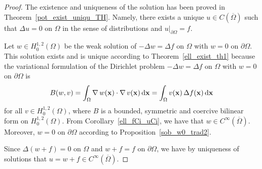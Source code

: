 \begin{proof}
The existence and uniqueness of the solution has been proved in
Theorem~\ref{pot_exist_uniqu_TH}.  Namely, there exists a unique
$u \in C(\overline{\Omega})$ such that $\Delta u = 0$ on $\Omega$ in
the sense of distributions and $u\big|_{\partial \Omega} = f$.

Let $\displaystyle w \in H^{1,2}_0(\Omega)$ be the weak solution of
$-\Delta w = \Delta f$ on $\Omega$ with $w=0$ on $\partial \Omega$.
This solution exists and is unique according to
Theorem~\ref{ell_exist_th1} because the variational formulation of the
Dirichlet problem $-\Delta w = \Delta f$ on $\Omega$ with $w=0$
on $\partial \Omega$ is
\[
B(w,v) = \int_\Omega \operatorname{\nabla} w(\mathbf{x}) \cdot \operatorname{\nabla} v(\mathbf{x})
\,\mathrm{d}{\mathbf{x}} = \int_\Omega v(\mathbf{x}) \, \Delta f(\mathbf{x})
\,\mathrm{d}{\mathbf{x}}
\]
for all $\displaystyle v \in H^{1,2}_0(\Omega)$,
where $B$ is a bounded, symmetric and coercive bilinear form on
$\displaystyle H^{1,2}_0(\Omega)$.
From Corollary~\ref{ell_fCi_uCi}, we have that
$\displaystyle w \in C^\infty(\overline{\Omega})$.  Moreover, $w=0$ on
$\partial \Omega$ according to Proposition~\ref{sob_w0_trad2}.

Since $\Delta (w+f) = 0$ on $\Omega$ and $w+f =f$ on
$\partial \Omega$, we have by uniqueness of solutions that
$\displaystyle u = w+f \in C^\infty(\overline{\Omega})$.
\end{proof}

